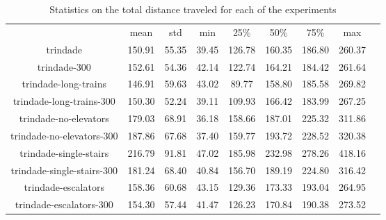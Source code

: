 \begin{table*}
    \begin{tabular}{|c|cccccccc|}
      & mean & std & min & 25\% & 50\% & 75\% & max \\
    trindade  & 150.91 & 55.35 & 39.45 & 126.78 & 160.35 & 186.80 & 260.37 \\
    trindade-300  & 152.61 & 54.36 & 42.14 & 122.74 & 164.21 & 184.42 & 261.64 \\
    trindade-long-trains  & 146.91 & 59.63 & 43.02 & 89.77 & 158.80 & 185.58 & 269.82 \\
    trindade-long-trains-300  & 150.30 & 52.24 & 39.11 & 109.93 & 166.42 & 183.99 & 267.25 \\
    trindade-no-elevators  & 179.03 & 68.91 & 36.18 & 158.66 & 187.01 & 225.32 & 311.86 \\
    trindade-no-elevators-300  & 187.86 & 67.68 & 37.40 & 159.77 & 193.72 & 228.52 & 320.38 \\
    trindade-single-stairs  & 216.79 & 91.81 & 47.02 & 185.98 & 232.98 & 278.26 & 418.16 \\
    trindade-single-stairs-300  & 181.24 & 68.40 & 40.84 & 156.70 & 189.19 & 224.80 & 316.42 \\
    trindade-escalators  & 158.36 & 60.68 & 43.15 & 129.36 & 173.33 & 193.04 & 264.95 \\
    trindade-escalators-300  & 154.30 & 57.44 & 41.47 & 126.23 & 170.84 & 190.38 & 273.52 \\
    \end{tabular}
\caption{Statistics on the total distance traveled for each of the experiments}
\label{annex:distance}

\end{table*}


